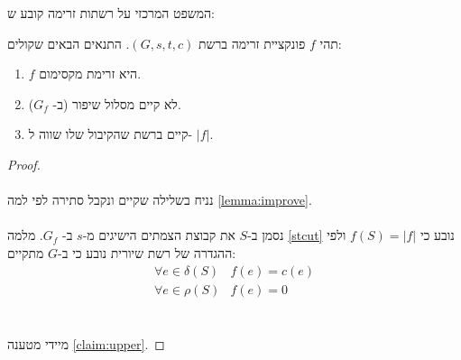 המשפט המרכזי על רשתות זרימה קובע ש:
\begin{theorem}
תהי $f$ פונקציית זרימה ברשת
$(G, s, t, c)$.
התנאים הבאים שקולים:
\begin{enumerate}
\item
$f$
היא זרימת מקסימום.
\item
לא קיים מסלול שיפור (ב-%
$G_f$).
\item
קיים 
\stcut{}
ברשת שהקיבול שלו שווה ל-%
$|f|$.
\end{enumerate}
\end{theorem}

\begin{proof}
$ $
\\
\\
נניח בשלילה שקיים ונקבל סתירה לפי למה
\ref{lemma:improve}.
\\
\\
נסמן ב-$S$ את קבוצת הצמתים הישיגים מ-$s$ ב-%
$G_f$.
מלמה
\ref{stcut}
נובע כי
$f(S) = |f|$
ולפי ההגדרה של רשת שיורית נובע כי ב-$G$ מתקיים:
$$
\begin{array}{ll}
\forall e \in \delta(S) & f(e) = c(e)
\\
\forall e \in \rho(S) & f(e) = 0
\end{array}
$$
\\
\\
מיידי מטענה 
\ref{claim:upper}.
\end{proof}

